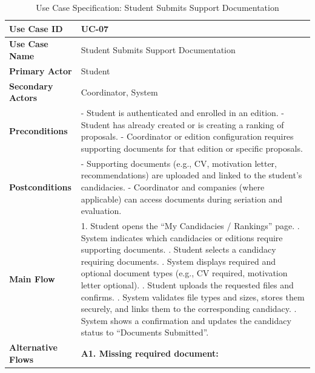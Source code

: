 \newpage
\renewcommand{\arraystretch}{1.5} 
\begin{xltabular}{\textwidth}{|l|X|}
    \caption{Use Case Specification: Student Submits Support Documentation} \label{tab:UC-07} \\
    
    \hline
    \textbf{Use Case ID} & UC-07 \\ \hline
    \textbf{Use Case Name} & Student Submits Support Documentation \\ \hline
    \textbf{Primary Actor} & Student \\ \hline
    \textbf{Secondary Actors} & Coordinator, System \\ \hline
    \textbf{Preconditions} &
        - Student is authenticated and enrolled in an edition. \newline
        - Student has already created or is creating a ranking of proposals. \newline
        - Coordinator or edition configuration requires supporting documents for that edition or specific proposals.
        \\ \hline
    \textbf{Postconditions} &
        - Supporting documents (e.g., CV, motivation letter, recommendations) are uploaded and linked to the student’s candidacies. \newline
        - Coordinator and companies (where applicable) can access documents during seriation and evaluation.
        \\ \hline
    \textbf{Main Flow} &
        1. Student opens the “My Candidacies / Rankings” page. . System indicates which candidacies or editions require supporting documents. . Student selects a candidacy requiring documents. . System displays required and optional document types (e.g., CV required, motivation letter optional). . Student uploads the requested files and confirms. . System validates file types and sizes, stores them securely, and links them to the corresponding candidacy. . System shows a confirmation and updates the candidacy status to “Documents Submitted”. \\ \hline
    \textbf{Alternative Flows} &
        \textbf{A1. Missing required document:} \newline

\end{xltabular}
